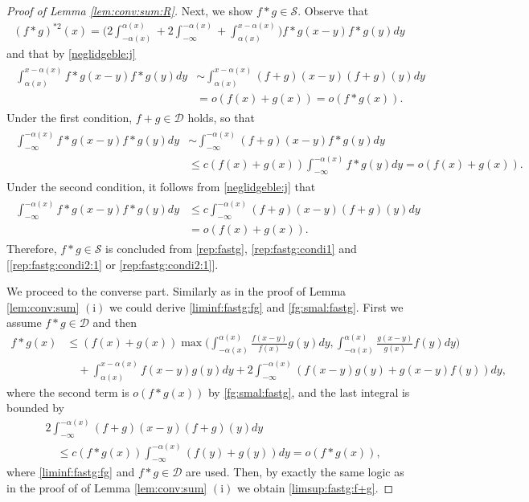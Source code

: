 \documentclass[12pt,leqno]{amsart}
\newcommand{\cals}{{\mathcal S}}
\newcommand{\cald}{{\mathcal D}}
\newcommand{\1}{{\mathbf 1}}
\begin{document}
\begin{proof}[Proof of Lemma \ref{lem:conv:sum:R}]
Next, we show $f\ast g\in \cals$. Observe that 
\begin{align}
\label{rep:fastg}
 (f\ast g)^{\ast 2}(x) = \Big(
2\int_{-\alpha(x)}^{\alpha(x)} + 2\int_{-\infty}^{-\alpha(x)} + \int_{\alpha(x)}^{x-\alpha(x)}
\Big) f\ast g(x-y) f\ast g(y) dy 
\end{align}
and that by \eqref{neglidgeble:j} 
\begin{align}
\begin{split}
\label{rep:fastg:condi1}
 \int_{\alpha(x)}^{x-\alpha(x)} f\ast g(x-y) f\ast g(y)dy 
&\sim \int_{\alpha(x)}^{x-\alpha(x)} (f+g)(x-y)(f+g)(y)dy \\
&=o(f(x)+g(x))=o(f\ast g(x)).
\end{split}  
\end{align}
Under the first condition, $f+g\in \cald$ holds, so that 
\begin{align}
\begin{split}
\label{rep:fastg:condi2:1}
 \int_{-\infty}^{-\alpha(x)} f\ast g(x-y) f\ast g(y) dy & \sim 
 \int_{-\infty}^{-\alpha(x)} (f+g)(x-y) f\ast g(y) dy \\
 &\le c (f(x)+g(x)) \int_{-\infty}^{-\alpha(x)} f\ast g(y)dy =o(f(x)+g(x)).  
\end{split}
\end{align}
Under the second condition, it follows from \eqref{neglidgeble:j} that 
\begin{align}
\begin{split}
\label{rep:fastg:condi2:1}
 \int_{-\infty}^{-\alpha(x)} f\ast g(x-y)f\ast g(y) dy &\le c \int_{-\infty}^{-\alpha(x)} (f+g)(x-y)(f+g)(y)dy \\
& =o(f(x)+g(x)). 
\end{split}
\end{align}
Therefore, $f\ast g\in \cals$ is concluded from \eqref{rep:fastg}, \eqref{rep:fastg:condi1} and 
[\eqref{rep:fastg:condi2:1} or \eqref{rep:fastg:condi2:1}]. 


We proceed to the converse part. Similarly as in the proof of Lemma \ref{lem:conv:sum} $(\mathrm{i})$ we could derive 
\eqref{liminf:fastg:fg} and \eqref{fg:smal:fastg}. 
First we assume $f\ast g \in \cald$ and then 
\begin{align*}
 f\ast g(x) &\le (f(x)+g(x)) \max\Big(
\int_{-\alpha(x)}^{\alpha(x)} \frac{f(x-y)}{f(x)} g(y)dy, \int_{-\alpha(x)}^{\alpha(x)} \frac{g(x-y)}{g(x)} f(y)dy
\Big) \\
&\quad + \int_{\alpha(x)}^{x-\alpha(x)}f(x-y) g(y)dy  + 2 \int_{-\infty}^{-\alpha(x)} (f(x-y)g(y)+g(x-y)f(y)) dy,
\end{align*}
where the second term is $o(f\ast g(x))$ by \eqref{fg:smal:fastg}, and the last integral is bounded by 
\begin{align*}
& 2 \int_{-\infty}^{-\alpha(x)} (f+g)(x-y)(f+g)(y)dy \\
&\quad \le c (f\ast g(x)) \int_{-\infty}^{-\alpha(x)}(f(y)+g(y))dy =o(f\ast g(x)), 
\end{align*}
where \eqref{liminf:fastg:fg} and $f\ast g \in \cald$ are used. 
Then, by exactly the same logic as in the proof of of Lemma \ref{lem:conv:sum} $(\mathrm{i})$ 
we obtain \eqref{limsup:fastg:f+g}.



\end{proof}
\end{document}
